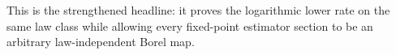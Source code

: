 This is the strengthened headline: it proves the logarithmic lower rate on the same law class while allowing every fixed-point estimator section to be an arbitrary law-independent Borel map.